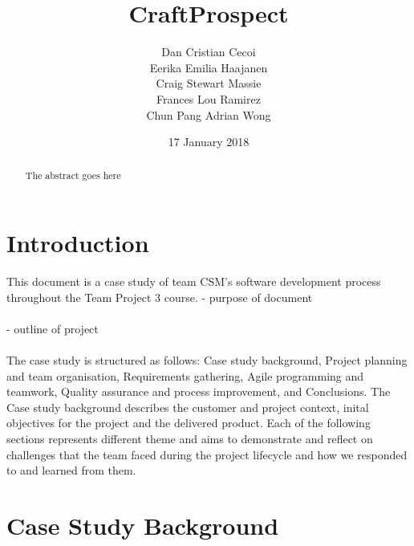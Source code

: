 \documentclass{l3proj}
\begin{document}
\title{CraftProspect}

\author{
		Dan Cristian Cecoi \\
		Eerika Emilia Haajanen \\
		Craig Stewart Massie \\
		Frances Lou Ramirez \\
		Chun Pang Adrian Wong }

\date{17 January 2018}

\maketitle

\begin{abstract}

The abstract goes here

\end{abstract}

\educationalconsent

\newpage

\section{Introduction}
\label{sec:introduction}

This document is a case study of team CSM's software development process throughout the Team Project 3 course.
- purpose of document
\\\\
- outline of project
\\\\
The case study is structured as follows: Case study background, Project planning and team organisation, Requirements gathering, Agile programming and teamwork, Quality assurance and process improvement, and Conclusions. The Case study background describes the customer and project context, inital objectives for the project and the delivered product. Each of the following sections represents different theme and aims to demonstrate and reflect on challenges that the team faced during the project lifecycle and how we responded to and learned from them.

\section{Case Study Background}
\label{sec:background}
\end{document}
